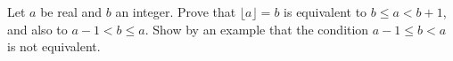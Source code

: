 Let $a$ be real and $b$ an integer. Prove that $\lfloor a\rfloor=b$ is equivalent to $b\le a<b+1$, and also to $a-1<b\le a$. Show by an example that the condition $a-1\le b<a$ is not equivalent.

